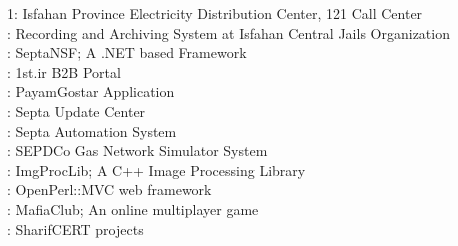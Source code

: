 \documentclass[12pt,a4paper]{article}
\begin{document}
		 	 1: Isfahan Province Electricity Distribution Center, 121 Call Center \\
			 : Recording and Archiving System at Isfahan Central Jails Organization \\ 
			 : SeptaNSF; A .NET based Framework \\
			 : 1st.ir B2B Portal \\
			 : PayamGostar Application \\
			 : Septa Update Center \\
			 : Septa Automation System \\
			 : SEPDCo Gas Network Simulator System \\
			 : ImgProcLib; A C++ Image Processing Library \\
			: OpenPerl::MVC web framework \\
		    : MafiaClub; An online multiplayer game \\
			: SharifCERT projects \\
					
\end{document}
